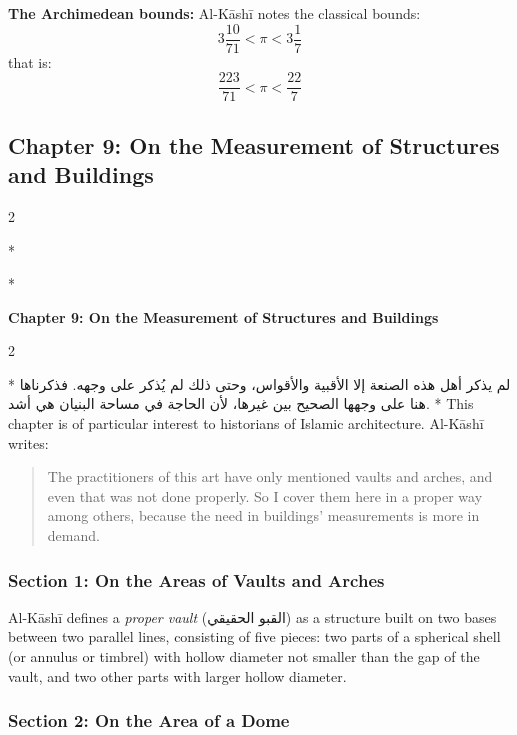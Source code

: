 \documentclass[11pt,a4paper]{article}
\newcommand{\ar}[1]{{\arabicfont\beginR #1\endR}}
\newenvironment{bilingual}{%
  \vspace{0.3em}%
  \begin{paracol}{2}%
}{%
  \end{paracol}%
  \vspace{0.3em}%
}
\begin{document}
\noindent\textbf{The Archimedean bounds:} Al-K\=ash\=i notes the classical
bounds:
\[
3\frac{10}{71} < \pi < 3\frac{1}{7}
\]
that is:
\[
\frac{223}{71} < \pi < \frac{22}{7}
\]

\subsection{Chapter 9: On the Measurement of Structures and Buildings}

\begin{bilingual}
\switchcolumn[0]*
\begin{center}
\textbf{\color{chapcolor}\ar{الباب التاسع في مساحة البنيان والأبنية}}
\end{center}
\switchcolumn[1]*
\begin{center}
\textbf{\color{chapcolor}Chapter 9: On the Measurement of Structures and Buildings}
\end{center}
\end{bilingual}

\begin{bilingual}
\switchcolumn[0]*
\ar{لم يذكر أهل هذه الصنعة إلا الأقبية والأقواس، وحتى ذلك لم يُذكر على وجهه. فذكرناها هنا على وجهها الصحيح بين غيرها، لأن الحاجة في مساحة البنيان هي أشد.}
\switchcolumn[1]*
This chapter is of particular interest to historians of Islamic
architecture. Al-K\=ash\=i writes:

\begin{quote}
The practitioners of this art have only mentioned vaults and arches,
and even that was not done properly. So I cover them here in a proper
way among others, because the need in buildings' measurements is more in
demand.
\end{quote}
\end{bilingual}

\subsubsection{Section 1: On the Areas of Vaults and Arches}

Al-K\=ash\=i defines a \textit{proper vault} (\ar{القبو الحقيقي}) as a
structure built on two bases between two parallel lines, consisting of
five pieces: two parts of a spherical shell (or annulus or timbrel) with
hollow diameter not smaller than the gap of the vault, and two other
parts with larger hollow diameter.

\subsubsection{Section 2: On the Area of a Dome}
\end{document}
